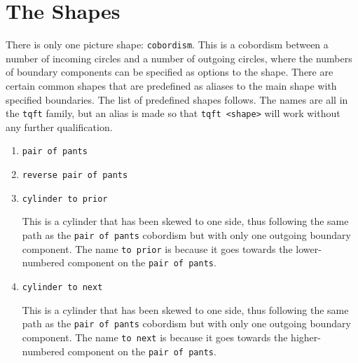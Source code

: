 \documentclass{ltxdoc}
\begin{document}
\section{The Shapes}

There is only one picture shape: \Verb+cobordism+.
This is a cobordism between a number of incoming circles and a number of outgoing circles, where the numbers of boundary components can be specified as options to the shape.
There are certain common shapes that are predefined as aliases to the main shape with specified boundaries.
The list of predefined shapes follows.
The names are all in the \Verb+tqft+ family, but an alias is made so that \Verb+tqft <shape>+ will work without any further qualification.

\begin{enumerate}
\item \Verb+pair of pants+


\item \Verb+reverse pair of pants+


\item \Verb+cylinder to prior+

This is a cylinder that has been skewed to one side, thus following the same path as the \Verb+pair of pants+ cobordism but with only one outgoing boundary component.
The name \Verb+to prior+ is because it goes towards the lower-numbered component on the \Verb+pair of pants+. 


\item \Verb+cylinder to next+

This is a cylinder that has been skewed to one side, thus following the same path as the \Verb+pair of pants+ cobordism but with only one outgoing boundary component.
The name \Verb+to next+ is because it goes towards the higher-numbered component on the \Verb+pair of pants+. 



\end{enumerate}
\end{document}
